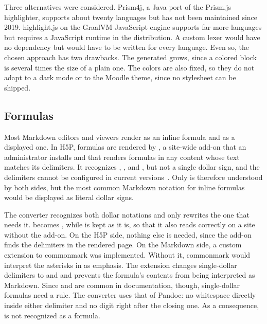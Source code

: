 Three alternatives were considered.
Prism4j, a Java port of the Prism.js highlighter, supports about twenty languages but has not been
maintained since 2019.
highlight.js on the GraalVM JavaScript engine supports far more languages but requires a JavaScript
runtime in the distribution.
A custom lexer would have no dependency but would have to be written for every language.
Even so, the chosen approach has two drawbacks.
The generated  grows, since a colored block is several times the size of a plain
one.
The colors are also fixed, so they do not adapt to a dark mode or to the Moodle theme, since no
stylesheet can be shipped.

\subsection{Formulas}
\label{sec:ex_math}

Most Markdown editors and viewers render  as an inline formula and  as a
displayed one.
In H5P, formulas are rendered by , a site-wide add-on that an administrator
installs and that renders formulas in any content whose text matches its delimiters.
It recognizes , \code{\textbackslash[x\textbackslash]}, and
, but not a single dollar sign, and the delimiters cannot be configured in current
versions~\cite{H5P:MathDisplay}.
Only  is therefore understood by both sides, but the most common Markdown notation for
inline formulas would be displayed as literal dollar signs.

The converter recognizes both dollar notations and only rewrites the one that needs it.
 becomes , while  is kept as it is,
so that it also reads correctly on a site without the add-on.
On the H5P side, nothing else is needed, since the add-on finds the delimiters in the rendered page.
On the Markdown side, a custom extension to commonmark was implemented.
Without it, commonmark would interpret the asterisks in  as emphasis.
The extension changes single-dollar delimiters to \code{\textbackslash(} and \code{\textbackslash)} and prevents the formula's contents from being interpreted as Markdown.
Since  and  are common in documentation, though, single-dollar formulas need a rule.
The converter uses that of Pandoc: no whitespace directly inside either delimiter and no digit right
after the closing one.
As a consequence,  is not recognized as a formula.

